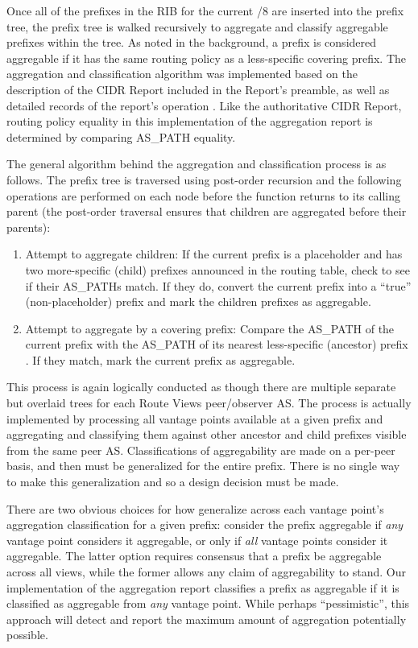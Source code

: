 Once all of the prefixes in the RIB for the current /8 are inserted into the
prefix tree, the prefix tree is walked recursively to aggregate and classify
aggregable prefixes within the tree. As noted in the background, a prefix is
considered aggregable if it has the same routing policy as a less-specific
covering prefix. The aggregation and classification algorithm was implemented
based on the description of the CIDR Report included in the Report's preamble,
as well as detailed records of the report's operation
\cite{cidr-report-details}. Like the authoritative CIDR Report, routing policy
equality in this implementation of the aggregation report is determined by
comparing AS\_PATH equality.

The general algorithm behind the aggregation and classification process is as
follows. The prefix tree is traversed using post-order recursion and the
following operations are performed on each node before the function returns to
its calling parent (the post-order traversal ensures that children are
aggregated before their parents):

\begin{enumerate}
    \item{Attempt to aggregate children: If the current prefix is a placeholder
    and has two more-specific (child) prefixes announced in the routing table,
    check to see if their AS\_PATHs match. If they do, convert the current
    prefix into a ``true'' (non-placeholder) prefix and mark the children
    prefixes as aggregable.}
    \item{Attempt to aggregate by a covering prefix: Compare the AS\_PATH of
    the current prefix with the AS\_PATH of its nearest less-specific
    (ancestor) prefix . If they match, mark the current prefix as aggregable.}
\end{enumerate}

This process is again logically conducted as though there are multiple separate
but overlaid trees for each Route Views peer/observer AS. The process is
actually implemented by processing all vantage points available at a given
prefix and aggregating and classifying them against other ancestor and child
prefixes visible from the same peer AS. Classifications of aggregability are
made on a per-peer basis, and then must be generalized for the entire prefix.
There is no single way to make this generalization and so a design decision
must be made.

There are two obvious choices for how generalize across each vantage point's
aggregation classification for a given prefix: consider the prefix aggregable
if \emph{any} vantage point considers it aggregable, or only if \emph{all}
vantage points consider it aggregable. The latter option requires consensus
that a prefix be aggregable across all views, while the former allows any claim
of aggregability to stand. Our implementation of the aggregation report
classifies a prefix as aggregable if it is classified as aggregable from
\emph{any} vantage point. While perhaps ``pessimistic'', this approach will
detect and report the maximum amount of aggregation potentially possible.

